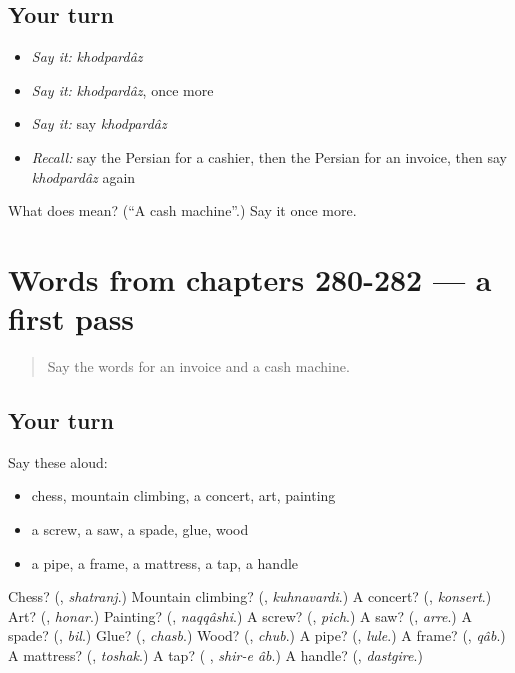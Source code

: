 \subsection*{Your turn}
\begin{itemize}
\raggedright
  \item \emph{Say it:} \emph{khodpardâz}
  \item \emph{Say it:} \emph{khodpardâz}, once more
  \item \emph{Say it:} say \emph{khodpardâz}
  \item \emph{Recall:} say the Persian for a cashier, then the Persian for an invoice, then say \emph{khodpardâz} again
\end{itemize}

\begin{tcolorbox}[breakable,colback=teal!4,colframe=teal!35!black,title={Before you move on}]
What does  mean? (\textquotedblleft{}A cash machine\textquotedblright{}.) Say it once more.
\end{tcolorbox}
\section[(dialogue)]{Words from chapters 280-282 — a first pass}

\label{lesson:FA-R286-first-pass-words-from-chapters-280-282}



\begin{quote}
Say the words for an invoice and a cash machine.
\end{quote}

\subsection*{Your turn}
Say these aloud:

\begin{itemize}
\raggedright
  \item chess, mountain climbing, a concert, art, painting
  \item a screw, a saw, a spade, glue, wood
  \item a pipe, a frame, a mattress, a tap, a handle
\end{itemize}

\begin{tcolorbox}[breakable,colback=teal!4,colframe=teal!35!black,title={Before you move on}]
Chess? (\textbf{}, \emph{shatranj}.) Mountain climbing? (\textbf{}, \emph{kuhnavardi}.) A concert? (\textbf{}, \emph{konsert}.) Art? (\textbf{}, \emph{honar}.) Painting? (\textbf{}, \emph{naqqâshi}.) A screw? (\textbf{}, \emph{pich}.) A saw? (\textbf{}, \emph{arre}.) A spade? (\textbf{}, \emph{bil}.) Glue? (\textbf{}, \emph{chasb}.) Wood? (\textbf{}, \emph{chub}.) A pipe? (\textbf{}, \emph{lule}.) A frame? (\textbf{}, \emph{qâb}.) A mattress? (\textbf{}, \emph{toshak}.) A tap? (\textbf{ }, \emph{shir-e âb}.) A handle? (\textbf{}, \emph{dastgire}.)
\end{tcolorbox}
